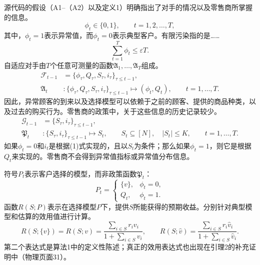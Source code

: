\documentclass{article}
\begin{document}
源代码的假设（A1–（A2）以及定义1）明确指出了对手的情况以及零售商所掌握的信息。
\[
\phi_t\in\{0,1\},\qquad t=1,2,\ldots,T,
\]
其中，$\phi_t=1$表示异常值，而$\phi_t=0$表示典型客户。有限污染指的是……
\[
\sum_{t=1}^{T}\phi_t\le\varepsilon T. \tag{A1}
\]
自适应对手由$T$个任意可测量的函数$\mathfrak{A}_1,\ldots,\mathfrak{A}_T$组成。
\[
\begin{aligned}
\mathcal{F}_{t-1}&=\{\phi_\tau,Q_\tau,S_\tau,i_\tau\}_{\tau\le t-1},\\
\mathfrak{A}_t &: \{\phi_\tau,Q_\tau,S_\tau,i_\tau\}_{\tau\le t-1}
\longmapsto(\phi_t,Q_t),\qquad t=1,\ldots,T.
\end{aligned}
\tag{A2 / Definition 1}
\]
因此，异常顾客的到来以及选择模型可以依赖于之前的顾客、提供的商品种类，以及过去的购买行为。零售商的政策中，关于这些信息的历史记录较少。
\[
\begin{aligned}
\mathcal{G}_{t-1}&=\{S_\tau,i_\tau\}_{\tau\le t-1},\\
\mathfrak{P}_t &: \{S_\tau,i_\tau\}_{\tau\le t-1}\longmapsto S_t,
\qquad S_t\subseteq[N],\quad |S_t|\le K,
\qquad t=1,\ldots,T.
\end{aligned}
\]
如果$\phi_t=0$和$i_t$是根据(1)式实现的，且以$S_t$为条件；那么如果$\phi_t=1$，则它是根据$Q_t$来实现的。零售商不会得到异常值指标或异常值分布信息。

符号$P_t$表示客户选择的模型，而非政策函数$\mathfrak{P}_t$：
\[
P_t=\begin{cases}
\{v\},&\phi_t=0,\\
Q_t,&\phi_t=1.
\end{cases}
\]
函数$R(S;P)$表示在选择模型$P$下，提供$S$所能获得的预期收益。分别针对典型模型和估算的效用值进行计算。
\[
R(S;\{v\})=R(S;v)=\frac{\sum_{i\in S}r_iv_i}{1+\sum_{i\in S}v_i},
\qquad
R(S;\widehat v)=\frac{\sum_{i\in S}r_i\widehat v_i}{1+\sum_{i\in S}\widehat v_i}.
\]
第二个表达式是算法1中的定义性陈述；真正的效用表达式也出现在引理2的补充证明中（物理页面31）。
\end{document}
